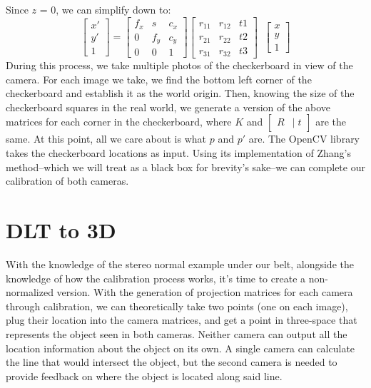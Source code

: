 \documentclass[
    12pt,
    twoside,
    bibstyle=chicago,
    headerstyle=uppercase,
	bibfile=thesis.bib
]{reedthesis}
\newcommand{\rt}{\left[\begin{smallmatrix}R &|\; t\end{smallmatrix}\right]}
\begin{document}

Since $z$ = 0, we can simplify down to:
\[\begin{bmatrix}x' \\ y' \\ 1\end{bmatrix} = \begin{bmatrix}f_x & s & c_x \\ 0 & f_y & c_y \\ 0 & 0 & 1\end{bmatrix} \begin{bmatrix} r_{11}&r_{12}&t{1}\\r_{21}&r_{22}&t{2}\\r_{31}&r_{32}&t{3}\end{bmatrix}\;\;\begin{bmatrix}x \\ y \\ 1\end{bmatrix} \]
During this process, we take multiple photos of the checkerboard in view of the camera. For each image we take, we find the bottom left corner of the checkerboard and establish it as the world origin. Then, knowing the size of the checkerboard squares in the real world, we generate a version of the above matrices for each corner in the checkerboard, where $K$ and $\rt$ are the same. At this point, all we care about is what $p$ and $p'$ are. The OpenCV library takes the checkerboard locations as input. Using its implementation of Zhang's method--which we will treat as a black box for brevity's sake--we can complete our calibration of both cameras.

\section{DLT to 3D}
With the knowledge of the stereo normal example under our belt, alongside the knowledge of how the calibration process works, it's time to create a non-normalized version. With the generation of projection matrices for each camera through calibration, we can theoretically take two points (one on each image), plug their location into the camera matrices, and get a point in three-space that represents the object seen in both cameras. Neither camera can output all the location information about the object on its own. A single camera can calculate the line that would intersect the object, but the second camera is needed to provide feedback on where the object is located along said line.
\end{document}
